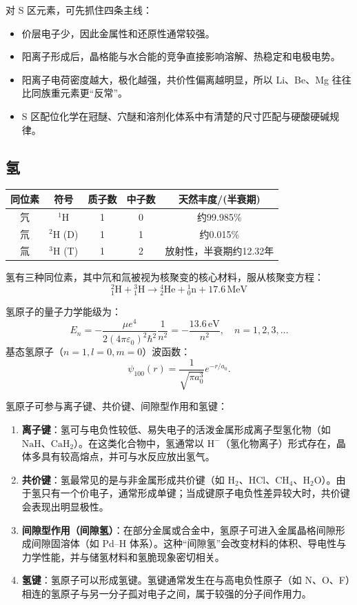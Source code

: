 \documentclass[UTF8]{ctexbook}
\begin{document}
对 S 区元素，可先抓住四条主线：
\begin{itemize}
  \item 价层电子少，因此金属性和还原性通常较强。
  \item 阳离子形成后，晶格能与水合能的竞争直接影响溶解、热稳定和电极电势。
  \item 阳离子电荷密度越大，极化越强，共价性偏离越明显，所以 Li、Be、Mg 往往比同族重元素更“反常”。
  \item  S 区配位化学在冠醚、穴醚和溶剂化体系中有清楚的尺寸匹配与硬酸硬碱规律。
\end{itemize}


\subsection{氢}



\noindent\begin{tabular*}{\textwidth}{@{\extracolsep{\fill}}ccccc@{}}
\toprule
同位素 & 符号 & 质子数 & 中子数 & 天然丰度/(半衰期) \\
\midrule
氕 & $^{1}\mathrm{H}$ & 1 & 0 & 约99.985\% \\
氘 & $^{2}\mathrm{H}$ (D) & 1 & 1 & 约0.015\% \\
氚 & $^{3}\mathrm{H}$ (T) & 1 & 2 & 放射性，半衰期约12.32年 \\
\bottomrule
\end{tabular*}

氢有三种同位素，其中氘和氚被视为核聚变的核心材料，服从核聚变方程：
\[
{}^{2}_{1}\mathrm{H}+{}^{3}_{1}\mathrm{H}\rightarrow{}^{4}_{2}\mathrm{He}+{}^{1}_{0}\mathrm{n}+17.6\,\mathrm{MeV}
\]

氢原子的量子力学能级为：
\[
E_n=-\frac{\mu e^4}{2(4\pi\varepsilon_0)^2\hbar^2}\frac{1}{n^2}=-\frac{13.6\,\mathrm{eV}}{n^2},\quad n=1,2,3,\dots
\]
基态氢原子（$n=1,l=0,m=0$）波函数：
\[
\psi_{100}(r)=\frac{1}{\sqrt{\pi a_0^3}}e^{-r/a_0}.
\]

氢原子可参与离子键、共价键、间隙型作用和氢键：

\begin{enumerate}
  \item \textbf{离子键}：氢可与电负性较低、易失电子的活泼金属形成离子型氢化物（如 $\mathrm{NaH}$、$\mathrm{CaH_2}$）。在这类化合物中，氢通常以 $\mathrm{H^-}$（氢化物离子）形式存在，晶体多具有较高熔点，并可与水反应放出氢气。
  \item \textbf{共价键}：氢最常见的是与非金属形成共价键（如 $\mathrm{H_2}$、$\mathrm{HCl}$、$\mathrm{CH_4}$、$\mathrm{H_2O}$）。由于氢只有一个价电子，通常形成单键；当成键原子电负性差异较大时，共价键会表现出明显极性。
  \item \textbf{间隙型作用（间隙氢）}：在部分金属或合金中，氢原子可进入金属晶格间隙形成间隙固溶体（如 Pd--H 体系）。这种“间隙氢”会改变材料的体积、导电性与力学性能，并与储氢材料和氢脆现象密切相关。
  \item \textbf{氢键}：氢原子可以形成氢键。氢键通常发生在与高电负性原子（如 N、O、F）相连的氢原子与另一分子孤对电子之间，属于较强的分子间作用力。
\end{enumerate}
\end{document}
